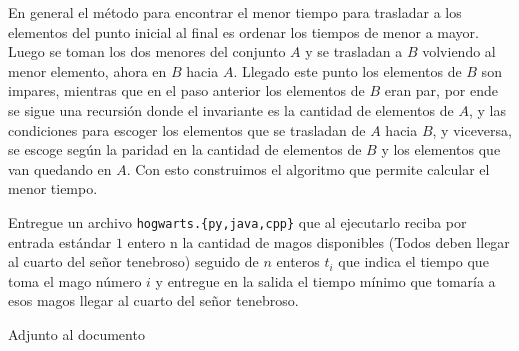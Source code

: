 \documentclass[letterpaper,10pt,table, dvipsnames]{article}
\begin{document}
En general el método para encontrar el menor tiempo para trasladar a los elementos del punto inicial al final es ordenar los tiempos de menor a mayor. Luego se toman los dos menores del conjunto $A$ y se trasladan a $B$ volviendo al menor elemento, ahora en $B$ hacia $A$. Llegado este punto los elementos de $B$ son impares, mientras que en el paso anterior los elementos de $B$ eran par, por ende se sigue una recursión donde el invariante es la cantidad de elementos de $A$, y las condiciones para escoger los elementos que se trasladan de $A$ hacia $B$, y viceversa, se escoge según la paridad en la cantidad de elementos de $B$ y los elementos que van quedando en $A$. Con esto construimos el algoritmo que permite calcular el menor tiempo.\\


\begin{tcolorbox}
  Entregue un archivo \texttt{hogwarts.\{py,java,cpp\}} que al ejecutarlo reciba por entrada estándar $1$ entero n la cantidad de magos disponibles (Todos deben llegar al cuarto del señor tenebroso) seguido de $n$ enteros $t_i$ que indica el tiempo que toma el mago número $i$ y entregue en la salida el tiempo mínimo que tomaría a esos magos llegar al cuarto del señor tenebroso.
\end{tcolorbox}

Adjunto al documento
\end{document}

